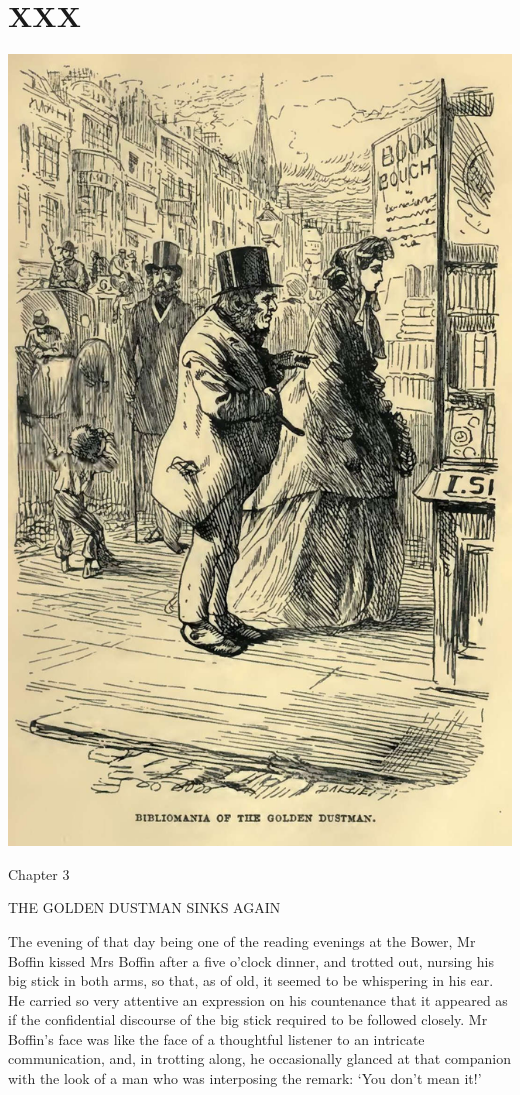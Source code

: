 
\chapter{XXX}

\includegraphics[scale=2.3]{03-05-01}

Chapter 3

THE GOLDEN DUSTMAN SINKS AGAIN


The evening of that day being one of the reading evenings at the Bower,
Mr Boffin kissed Mrs Boffin after a five o’clock dinner, and trotted
out, nursing his big stick in both arms, so that, as of old, it seemed
to be whispering in his ear. He carried so very attentive an expression
on his countenance that it appeared as if the confidential discourse of
the big stick required to be followed closely. Mr Boffin’s face was like
the face of a thoughtful listener to an intricate communication, and, in
trotting along, he occasionally glanced at that companion with the look
of a man who was interposing the remark: ‘You don’t mean it!’

